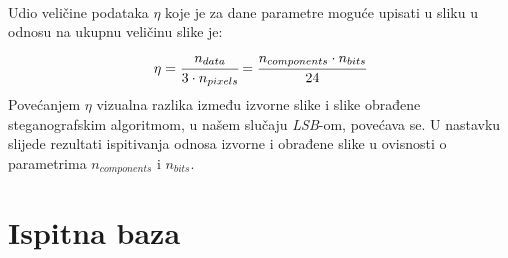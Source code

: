\documentclass[times, utf8, seminar]{fer}
\begin{document}
\paragraph{}
Udio veličine podataka $\eta$ koje je za dane parametre moguće upisati u sliku u odnosu na ukupnu veličinu slike je:
\begin{equation}
\label{eta}
\eta = \cfrac{n_{data}}{3 \cdot n_{pixels}} = \cfrac{n_{components} \cdot n_{bits}}{24}
\end{equation}
Povećanjem $\eta$ vizualna razlika između izvorne slike i slike obrađene steganografskim algoritmom, u našem slučaju \textit{LSB}-om, povećava se. U nastavku slijede rezultati ispitivanja odnosa izvorne i obrađene slike u ovisnosti o parametrima $n_{components}$ i $n_{bits}$.
\section{Ispitna baza}
\end{document}

